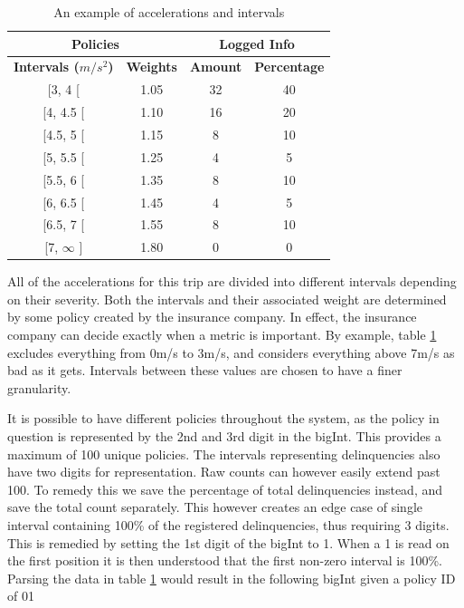 \begin{table}[h]
\centering
\begin{tabular}{cc | cc}
\multicolumn{2}{c}{\textbf{Policies}} & \multicolumn{2}{c}{\textbf{Logged Info}} \\\hline
\textbf{Intervals ($m/s^{2}$)}     & \textbf{Weights}     & \textbf{Amount}     & \textbf{Percentage}     \\\hline
{[}3, 4 {[}              & 1.05              &   32            & 40              \\
{[}4, 4.5 {[}            & 1.10              &   16            & 20              \\
{[}4.5, 5 {[}            & 1.15              &   8             & 10              \\
{[}5, 5.5 {[}            & 1.25              &   4             & 5              \\
{[}5.5, 6 {[}            & 1.35              &   8             & 10              \\
{[}6, 6.5 {[}            & 1.45              &   4             & 5              \\
{[}6.5, 7 {[}            & 1.55              &   8             & 10              \\
{[}7, $\infty$ {]}       & 1.80              &   0             & 0              \\\hline
\end{tabular}
\caption{An example of accelerations and intervals}
\label{tab:intervalexample}
\end{table}

All of the accelerations for this trip are divided into different intervals depending on their severity. Both the intervals and their associated weight are determined by some policy created by the insurance company. In effect, the insurance company can decide exactly when a metric is important. By example, table \ref{tab:intervalexample} excludes everything from 0m/s to 3m/s, and considers everything above 7m/s as bad as it gets. Intervals between these values are chosen to have a finer granularity.

It is possible to have different policies throughout the system, as the policy in question is represented by the 2nd and 3rd digit in the bigInt. This provides a maximum of 100 unique policies. The intervals representing delinquencies also have two digits for representation. Raw counts can however easily extend past 100. To remedy this we save the percentage of total delinquencies instead, and save the total count separately. This however creates an edge case of single interval containing 100\% of the registered delinquencies, thus requiring 3 digits. This is remedied by setting the 1st digit of the bigInt to 1. When a 1 is read on the first position it is then understood that the first non-zero interval is 100\%. Parsing the data in table \ref{tab:intervalexample} would result in the following bigInt given a policy ID of 01

